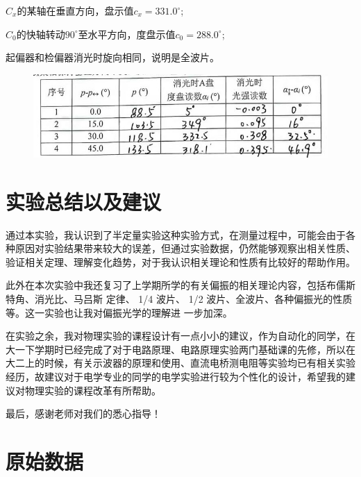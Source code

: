 \documentclass[UTF8]{ctexart}
\begin{document}
$C_x$的某轴在垂直方向，盘示值$c_x=331.0^\circ$;

$C_0$的快轴转动$90^\circ$至水平方向，度盘示值$c_0=288.0^\circ$;

起偏器和检偏器消光时旋向相同，说明是全波片。
\begin{figure}[H]
  \centering
  \includegraphics[scale=0.5]{11.jpg}
\end{figure}


\section{实验总结以及建议}

通过本实验，我认识到了半定量实验这种实验方式，在测量过程中，可能会由于各种原因对实验结果带来较大的误差，但通过实验数据，仍然能够观察出相关性质、验证相关定理、理解变化趋势，对于我认识相关理论和性质有比较好的帮助作用。

此外在本次实验中我还复习了上学期所学的有关偏振的相关理论内容，包括布儒斯特角、消光比、马吕斯
定律、 1/4 波片、 1/2 波片、全波片、各种偏振光的性质等。这一实验也让我对偏振光学的理解进
一步加深。

在实验之余，我对物理实验的课程设计有一点小小的建议，作为自动化的同学，在大一下学期时已经完成了对于电路原理、电路原理实验两门基础课的先修，所以在大二上的时候，有关示波器的原理和使用、直流电桥测电阻等实验均已有相关实验经历，故建议对于电学专业的同学的电学实验进行较为个性化的设计，希望我的建议对物理实验的课程改革有所帮助。

最后，感谢老师对我们的悉心指导！

\section{原始数据}
\end{document}
